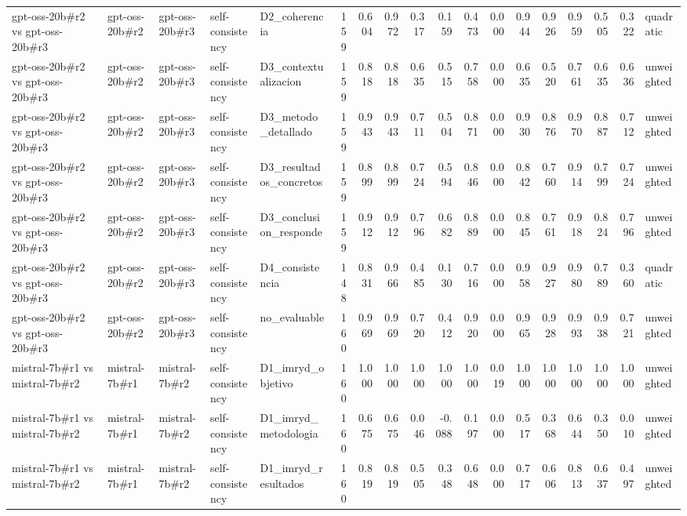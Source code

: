 \begin{table}
{\begin{tabular}{lllllrrrrrrrrrrrrl}
gpt-oss-20b\#r2 vs gpt-oss-20b\#r3 & gpt-oss-20b\#r2 & gpt-oss-20b\#r3 & self-consistency & D2\_coherencia & 159 & 0.604 & 0.972 & 0.317 & 0.159 & 0.473 & 0.000 & 0.944 & 0.926 & 0.959 & 0.505 & 0.322 & quadratic \\
gpt-oss-20b\#r2 vs gpt-oss-20b\#r3 & gpt-oss-20b\#r2 & gpt-oss-20b\#r3 & self-consistency & D3\_contextualizacion & 159 & 0.818 & 0.818 & 0.635 & 0.515 & 0.758 & 0.000 & 0.635 & 0.520 & 0.761 & 0.635 & 0.636 & unweighted \\
gpt-oss-20b\#r2 vs gpt-oss-20b\#r3 & gpt-oss-20b\#r2 & gpt-oss-20b\#r3 & self-consistency & D3\_metodo\_detallado & 159 & 0.943 & 0.943 & 0.711 & 0.504 & 0.871 & 0.000 & 0.930 & 0.876 & 0.970 & 0.887 & 0.712 & unweighted \\
gpt-oss-20b\#r2 vs gpt-oss-20b\#r3 & gpt-oss-20b\#r2 & gpt-oss-20b\#r3 & self-consistency & D3\_resultados\_concretos & 159 & 0.899 & 0.899 & 0.724 & 0.594 & 0.846 & 0.000 & 0.842 & 0.760 & 0.914 & 0.799 & 0.724 & unweighted \\
gpt-oss-20b\#r2 vs gpt-oss-20b\#r3 & gpt-oss-20b\#r2 & gpt-oss-20b\#r3 & self-consistency & D3\_conclusion\_responde & 159 & 0.912 & 0.912 & 0.796 & 0.682 & 0.889 & 0.000 & 0.845 & 0.761 & 0.918 & 0.824 & 0.796 & unweighted \\
gpt-oss-20b\#r2 vs gpt-oss-20b\#r3 & gpt-oss-20b\#r2 & gpt-oss-20b\#r3 & self-consistency & D4\_consistencia & 148 & 0.831 & 0.966 & 0.485 & 0.130 & 0.716 & 0.000 & 0.958 & 0.927 & 0.980 & 0.789 & 0.360 & quadratic \\
gpt-oss-20b\#r2 vs gpt-oss-20b\#r3 & gpt-oss-20b\#r2 & gpt-oss-20b\#r3 & self-consistency & no\_evaluable & 160 & 0.969 & 0.969 & 0.720 & 0.412 & 0.920 & 0.000 & 0.965 & 0.928 & 0.993 & 0.938 & 0.721 & unweighted \\
mistral-7b\#r1 vs mistral-7b\#r2 & mistral-7b\#r1 & mistral-7b\#r2 & self-consistency & D1\_imryd\_objetivo & 160 & 1.000 & 1.000 & 1.000 & 1.000 & 1.000 & 0.019 & 1.000 & 1.000 & 1.000 & 1.000 & 1.000 & unweighted \\
mistral-7b\#r1 vs mistral-7b\#r2 & mistral-7b\#r1 & mistral-7b\#r2 & self-consistency & D1\_imryd\_metodologia & 160 & 0.675 & 0.675 & 0.046 & -0.088 & 0.197 & 0.000 & 0.517 & 0.368 & 0.644 & 0.350 & 0.010 & unweighted \\
mistral-7b\#r1 vs mistral-7b\#r2 & mistral-7b\#r1 & mistral-7b\#r2 & self-consistency & D1\_imryd\_resultados & 160 & 0.819 & 0.819 & 0.505 & 0.348 & 0.648 & 0.000 & 0.717 & 0.606 & 0.813 & 0.637 & 0.497 & unweighted \\

\end{tabular}}
\end{table}
